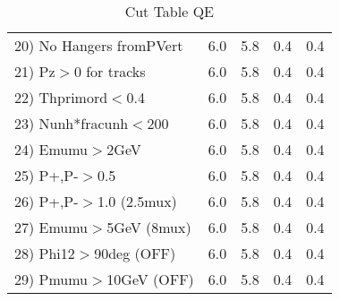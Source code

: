 \begin{table}[h!]
\begin{tabular}{||l||r|r|r|r||}
 20) No Hangers fromPVert &         6.0 &         5.8 &         0.4 &         0.4 \\
 21) Pz$>$0 for tracks    &         6.0 &         5.8 &         0.4 &         0.4 \\
 22) Thprimord$<$0.4      &         6.0 &         5.8 &         0.4 &         0.4 \\
 23) Nunh*fracunh$<$200   &         6.0 &         5.8 &         0.4 &         0.4 \\
 24) Emumu$>$2GeV         &         6.0 &         5.8 &         0.4 &         0.4 \\
 25) P+,P-$>$0.5          &         6.0 &         5.8 &         0.4 &         0.4 \\
 26) P+,P-$>$1.0 (2.5mux) &         6.0 &         5.8 &         0.4 &         0.4 \\
 27) Emumu$>$5GeV  (8mux) &         6.0 &         5.8 &         0.4 &         0.4 \\
 28) Phi12$>$90deg  (OFF) &         6.0 &         5.8 &         0.4 &         0.4 \\
 29) Pmumu$>$10GeV  (OFF) &         6.0 &         5.8 &         0.4 &         0.4 \\
 \hline
 \hline
 \end{tabular}
 \caption{Cut Table  QE     }
 \label{tab-cut____qe}
 \end{table}
